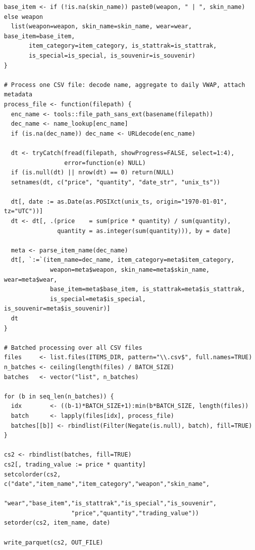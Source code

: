 \begin{lstlisting}[style=Rstyle, caption={Step 1: Data preprocessing and daily VWAP aggregation}]
  base_item <- if (!is.na(skin_name)) paste0(weapon, " | ", skin_name) else weapon
  list(weapon=weapon, skin_name=skin_name, wear=wear, base_item=base_item,
       item_category=item_category, is_stattrak=is_stattrak,
       is_special=is_special, is_souvenir=is_souvenir)
}

# Process one CSV file: decode name, aggregate to daily VWAP, attach metadata
process_file <- function(filepath) {
  enc_name <- tools::file_path_sans_ext(basename(filepath))
  dec_name <- name_lookup[enc_name]
  if (is.na(dec_name)) dec_name <- URLdecode(enc_name)

  dt <- tryCatch(fread(filepath, showProgress=FALSE, select=1:4),
                 error=function(e) NULL)
  if (is.null(dt) || nrow(dt) == 0) return(NULL)
  setnames(dt, c("price", "quantity", "date_str", "unix_ts"))

  dt[, date := as.Date(as.POSIXct(unix_ts, origin="1970-01-01", tz="UTC"))]
  dt <- dt[, .(price    = sum(price * quantity) / sum(quantity),
               quantity = as.integer(sum(quantity))), by = date]

  meta <- parse_item_name(dec_name)
  dt[, `:=`(item_name=dec_name, item_category=meta$item_category,
             weapon=meta$weapon, skin_name=meta$skin_name, wear=meta$wear,
             base_item=meta$base_item, is_stattrak=meta$is_stattrak,
             is_special=meta$is_special, is_souvenir=meta$is_souvenir)]
  dt
}

# Batched processing over all CSV files
files     <- list.files(ITEMS_DIR, pattern="\\.csv$", full.names=TRUE)
n_batches <- ceiling(length(files) / BATCH_SIZE)
batches   <- vector("list", n_batches)

for (b in seq_len(n_batches)) {
  idx        <- ((b-1)*BATCH_SIZE+1):min(b*BATCH_SIZE, length(files))
  batch      <- lapply(files[idx], process_file)
  batches[[b]] <- rbindlist(Filter(Negate(is.null), batch), fill=TRUE)
}

cs2 <- rbindlist(batches, fill=TRUE)
cs2[, trading_value := price * quantity]
setcolorder(cs2, c("date","item_name","item_category","weapon","skin_name",
                   "wear","base_item","is_stattrak","is_special","is_souvenir",
                   "price","quantity","trading_value"))
setorder(cs2, item_name, date)

write_parquet(cs2, OUT_FILE)
\end{lstlisting}


